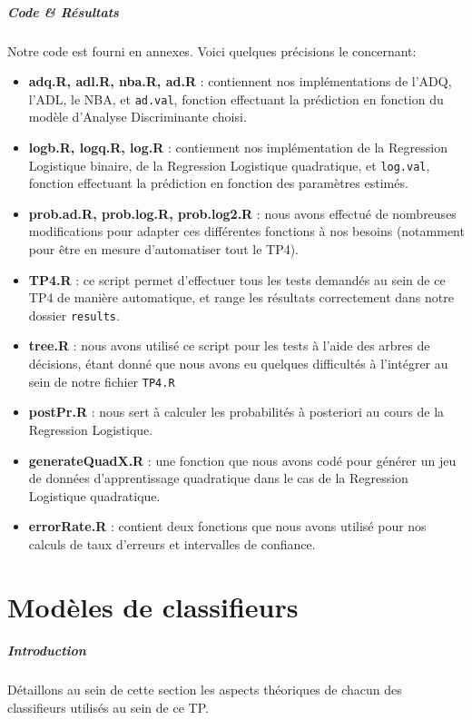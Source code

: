 \documentclass{report}
\begin{document}
\paragraph{Code \& Résultats}
Notre code est fourni en annexes. Voici quelques précisions le concernant:
\begin{itemize}
    \item \textbf{adq.R, adl.R, nba.R, ad.R} : contiennent nos implémentations de l'ADQ, l'ADL, le NBA, et \verb+ad.val+, fonction effectuant la prédiction en fonction du modèle d'Analyse Discriminante choisi.
    \item \textbf{logb.R, logq.R, log.R} : contiennent nos implémentation de la Regression Logistique binaire, de la Regression Logistique quadratique, et \verb+log.val+, fonction effectuant la prédiction en fonction des paramètres estimés.
    \item \textbf{prob.ad.R, prob.log.R, prob.log2.R} : nous avons effectué de nombreuses modifications pour adapter ces différentes fonctions à nos besoins (notamment pour être en mesure d'automatiser tout le TP4).
    \item \textbf{TP4.R} : ce script permet d'effectuer tous les tests demandés au sein de ce TP4 de manière automatique, et range les résultats correctement dans notre dossier \verb+results+.
    \item \textbf{tree.R} : nous avons utilisé ce script pour les tests à l'aide des arbres de décisions, étant donné que nous avons eu quelques difficultés à l'intégrer au sein de notre fichier \verb+TP4.R+
    \item \textbf{postPr.R} : nous sert à calculer les probabilités à posteriori au cours de la Regression Logistique.
    \item \textbf{generateQuadX.R} : une fonction que nous avons codé pour générer un jeu de données d'apprentissage quadratique dans le cas de la Regression Logistique quadratique.
    \item \textbf{errorRate.R} : contient deux fonctions que nous avons utilisé pour nos calculs de taux d'erreurs et intervalles de confiance.
\end{itemize}



\chapter{Modèles de classifieurs}
\paragraph{Introduction}
Détaillons au sein de cette section les aspects théoriques de chacun des classifieurs utilisés au sein de ce TP.
\end{document}
